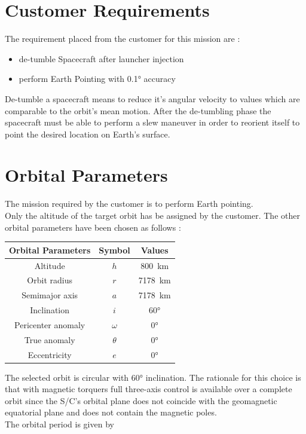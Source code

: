 \documentclass[11pt,a4paper]{report}
\begin{document}
\section{Customer Requirements}
The requirement placed from the customer for this mission are :

\begin{itemize}
 \item de-tumble Spacecraft after launcher injection
 \item perform Earth Pointing with \ang{0.1} accuracy
\end{itemize}

De-tumble a spacecraft means to reduce it's angular velocity to values which are comparable to the orbit's mean motion.
After the de-tumbling phase the spacecraft must be able to perform a slew maneuver in order to reorient itself to point the desired location on Earth's surface.

\section{Orbital Parameters}
The mission required by the customer is to perform Earth pointing. \\   
Only the altitude of the target orbit has be assigned by the customer. The other orbital parameters have been chosen as follows : 

\begin{table}[H]
	\centering
	\begin{tabular}{|c|c|c|}
		\hline
		Orbital Parameters & Symbol & Values \\
		\hline
		Altitude & $h$ & \SI{800}{\km} \\ 
		\hline
		Orbit radius & $r$ & \SI{7178}{\km}\\
		\hline
		Semimajor axis & $a$ & \SI{7178}{\km}\\
		\hline
		Inclination & $i$ & \ang{60}\\
		\hline
		Pericenter anomaly & $\omega$ & \ang{0}\\
		\hline
		True anomaly & $\theta$ &  \ang{0}\\
		\hline
		Eccentricity & $e$ &  \ang{0}\\
		\hline
	\end{tabular}
\end{table}

The selected orbit is circular with \ang{60} inclination.
The rationale for this choice is that with magnetic torquers full three-axis control is available over a complete orbit since the S/C's orbital plane does not coincide with the geomagnetic equatorial plane and does not contain the magnetic poles. \\
The orbital period is given by 
\end{document}
